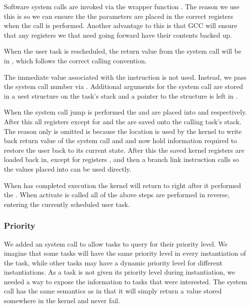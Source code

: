 \documentclass[pdftex,10pt,a4paper]{article}
\begin{document}
Software system calls are invoked via the wrapper function
. The reason we use this is so we can ensure the the
parameters are placed in the correct registers when the  call
is performed. Another advantage to this is that GCC will ensure that
any registers  we that need going forward have their
contents backed up.

When the user task is rescheduled, the return value from the system
call will be in , which follows the correct calling convention.

The immediate value associated with the  instruction is not
used. Instead, we pass the system call number via . Additional
arguments for the system call are stored in a uest
structure on the task's stack and a pointer to the structure is left
in .

When the system call jump is performed the  and  are
placed into  and  respectively. After this all
registers except for  and the  are saved onto the
calling task's stack. The reason only  is omitted is because
the  location is used by the kernel to write back return value
of the system call and  and  now hold information
required to restore the user back to its current state. After this the
saved kernel registers are loaded back in, except for registers
, and then a branch link instruction calls
 so the values placed into  can be
used directly.

When  has completed execution the kernel will
return to right after it performed the
. When activate is called all of the above
steps are performed in reverse, entering the currently scheduled user
task.

\subsubsection*{Priority}

We added an  system call to allow tasks to query
for their priority level. We imagine that some tasks will have the
same priority level in every instantiation of the task, while other
tasks may have a dynamic priority level for different
instantiations. As a task is not given its priority level during
instantiation, we needed a way to expose the information to tasks that
were interested. The  system call has the same
semantics as  in that it will simply return a value
stored somewhere in the kernel and never fail.
\end{document}
